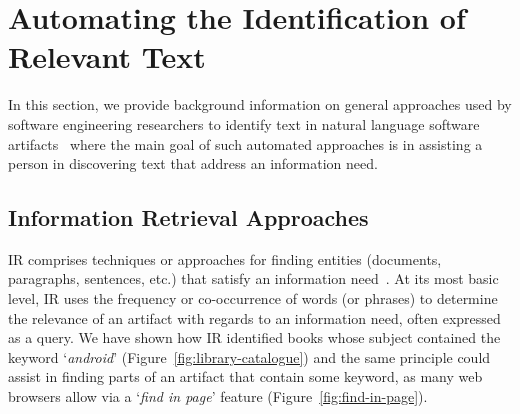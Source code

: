 


\section{Automating the Identification of Relevant Text}
\label{cp2:general-approaches}










In this section, we provide background information on general 
approaches used
by software engineering researchers 
to identify text in natural language software artifacts~\cite{Bavota2016}
where the main goal of such automated approaches is in assisting a person in discovering
text that address an information need.






\subsection{Information Retrieval Approaches}


\acf{IR} comprises techniques
or approaches for finding entities (documents, paragraphs, sentences, etc.)
that satisfy an information need~\cite{manning2010IR}.
At its most basic level, 
\acs{IR}
uses the 
frequency or co-occurrence of words (or phrases) to determine the relevance
of an artifact with regards to an information need, often expressed as a query.
We have shown how \acs{IR} identified
books whose subject contained
the keyword `\textit{android}' (Figure~\ref{fig:library-catalogue})
and the same principle could assist 
in finding parts of an artifact that contain some keyword, 
as many web browsers allow via a `\textit{find in page}' feature (Figure~\ref{fig:find-in-page}).







